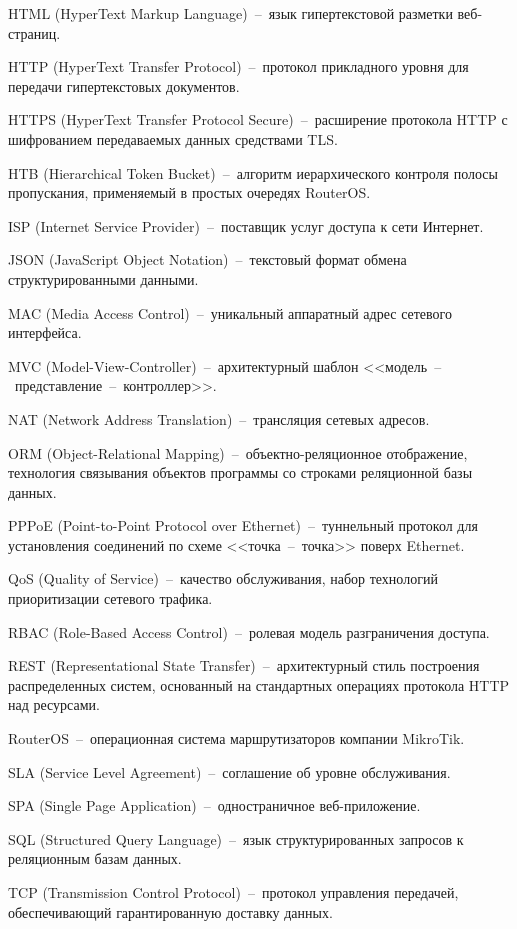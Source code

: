 HTML (HyperText Markup Language)~--~язык гипертекстовой разметки веб-страниц.

HTTP (HyperText Transfer Protocol)~--~протокол прикладного уровня для передачи гипертекстовых документов.

HTTPS (HyperText Transfer Protocol Secure)~--~расширение протокола HTTP с шифрованием передаваемых данных средствами TLS.

HTB (Hierarchical Token Bucket)~--~алгоритм иерархического контроля полосы пропускания, применяемый в простых очередях RouterOS.

ISP (Internet Service Provider)~--~поставщик услуг доступа к сети Интернет.

JSON (JavaScript Object Notation)~--~текстовый формат обмена структурированными данными.

MAC (Media Access Control)~--~уникальный аппаратный адрес сетевого интерфейса.

MVC (Model-View-Controller)~--~архитектурный шаблон <<модель~--~представление~--~контроллер>>.

NAT (Network Address Translation)~--~трансляция сетевых адресов.

ORM (Object-Relational Mapping)~--~объектно-реляционное отображение, технология связывания объектов программы со строками реляционной базы данных.

PPPoE (Point-to-Point Protocol over Ethernet)~--~туннельный протокол для установления соединений по схеме <<точка~--~точка>> поверх Ethernet.

QoS (Quality of Service)~--~качество обслуживания, набор технологий приоритизации сетевого трафика.

RBAC (Role-Based Access Control)~--~ролевая модель разграничения доступа.

REST (Representational State Transfer)~--~архитектурный стиль построения распределенных систем, основанный на стандартных операциях протокола HTTP над ресурсами.

RouterOS~--~операционная система маршрутизаторов компании MikroTik.

SLA (Service Level Agreement)~--~соглашение об уровне обслуживания.

SPA (Single Page Application)~--~одностраничное веб-приложение.

SQL (Structured Query Language)~--~язык структурированных запросов к реляционным базам данных.

TCP (Transmission Control Protocol)~--~протокол управления передачей, обеспечивающий гарантированную доставку данных.

